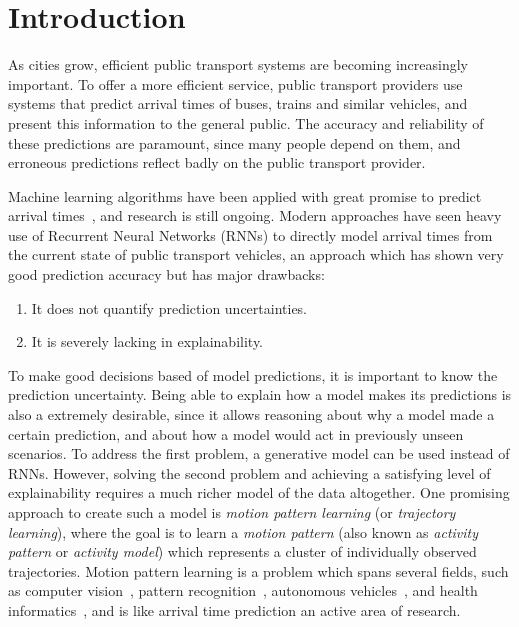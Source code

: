\chapter{Introduction}
\label{cha:introduction}
As cities grow, efficient public transport systems
are becoming increasingly important. To offer a more efficient
service, public transport providers use systems
that predict arrival times of buses, trains and similar vehicles,
and present this information to the general public. The accuracy
and reliability of these predictions are paramount, since many
people depend on them, and erroneous predictions reflect badly on the
public transport provider.

Machine learning algorithms have been applied with great
promise to predict arrival times~\cite{kim2017probabilistic, 
  pang2018learning, Nguyen2018Jun}, and research is still ongoing.
Modern approaches have seen heavy use of Recurrent Neural Networks
(RNNs) to directly model arrival times from the current state of public
transport vehicles, an approach which has shown very good prediction accuracy
but has major drawbacks:

\begin{enumerate}
\item It does not quantify prediction uncertainties.
\item It is severely lacking in explainability.
\end{enumerate}

To make good decisions based of model predictions, it is important to 
know the prediction uncertainty. Being able to explain how
a model makes its predictions is also a extremely desirable,
since it allows reasoning about why a model made a certain prediction,
and about how a model would act in previously unseen
scenarios. 
To address the first problem, a generative model can be used instead
of RNNs. However, solving the second problem and achieving a satisfying
level of explainability requires a much richer model of the data altogether.
One promising approach to create such a model is \textit{motion
  pattern learning} (or \textit{trajectory learning}), where the goal is to learn a \textit{motion
  pattern} (also known as \textit{activity
  pattern} or \textit{activity model})
which represents a cluster of individually observed
trajectories. Motion pattern learning is a problem which spans several
fields, such as computer vision~\cite{Morris2008Sep, Zhang2006Aug,
  Kim2011Nov, Campo2017Aug}, pattern recognition~\cite{Tang2018Aug}, autonomous 
vehicles~\cite{Goli2018Jun}, and health
informatics~\cite{Pimentel2013Sep}, and is like arrival time
prediction an active area of research.

